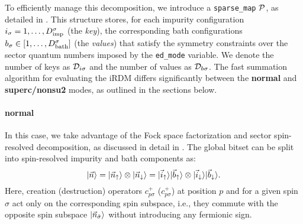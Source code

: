 \documentclass[edipack2.tex]{subfiles}
\begin{document}
To efficiently manage this decomposition, we introduce a 
{\tt sparse\_map} ${\cal P}$, as detailed in . 
This structure stores, for each impurity configuration 
$i_\sigma = 1, \dots, D^\sigma_\mathrm{imp}$ (the \emph{key}), the 
corresponding bath configurations 
$b_\sigma \in [1, \dots, D^\sigma_\mathrm{bath}]$ (the \emph{values}) that 
satisfy the symmetry constraints over the sector quantum numbers
imposed by the {\tt ed\_mode} variable.
We denote the number of keys as ${\cal D}_{i\sigma}$ and the 
number of values as ${\cal D}_{b\sigma}$.
The fast summation algorithm for evaluating the iRDM differs 
significantly between the {\bf normal} and {\bf superc/nonsu2} modes, 
as outlined in the sections below.





\paragraph{{\bf normal}}
In this case, we take advantage of the Fock space factorization and 
sector spin-resolved decomposition, as discussed in detail in 
. 
The global bitset can be split into spin-resolved 
impurity and bath components as:
\begin{equation}
|\vec{n}\rangle =
|\vec{n}_\uparrow\rangle\otimes |\vec{n}_\downarrow\rangle =
|\vec{i}_\uparrow\rangle|\vec{b}_\uparrow\rangle\otimes |\vec{i}_\downarrow\rangle|\vec{b}_\downarrow\rangle.
\end{equation}
Here, creation (destruction) operators  $c^+_{p\sigma}$
($c^+_{p\sigma}$) at position $p$ and for a given spin $\sigma$
act only on the corresponding 
spin subspace, i.e., they commute with the opposite spin 
subspace $|\vec{n}_{\bar{\sigma}}\rangle$ without introducing any 
fermionic sign.
\end{document}
